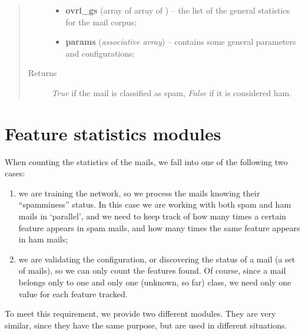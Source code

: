 \documentclass[letterpaper,10pt,english]{sphinxmanual}
\begin{document}
\begin{fulllineitems}
\begin{fulllineitems}
\begin{quote}
\begin{description}
\begin{itemize}
\item {} 
\textbf{ovrl\_gs} (array of array of {\hyperref[index:gen_stat.Stat]{}}) -- the list of the general statistics for the mail corpus;

\item {} 
\textbf{params} (\emph{associative array}) -- contains some general parameters and configurations;

\end{itemize}

\item[{Returns}] \leavevmode
\emph{True} if the mail is classified as spam, \emph{False} if it is            considered ham.

\end{description}\end{quote}

\end{fulllineitems}


\end{fulllineitems}



\chapter{Feature statistics modules}
\label{index:feature-statistics-modules}
When counting the statistics of the mails, we fall into one of the following two cases:
\begin{enumerate}
\item {} 
we are training the network, so we process the mails knowing their ``spamminess'' status. In this case we are working with both spam and ham mails in `parallel', and we need to keep track of how many times a certain feature appears in spam mails, and how many times the same feature appears in ham mails;

\item {} 
we are validating the configuration, or discovering the status of a mail (a set of mails), so we can only count the features found. Of course, since a mail belongs only to one and only one (unknown, so far) class, we need only one value for each feature tracked.

\end{enumerate}

To meet this requirement, we provide two different modules. They are very similar, since they have the same purpose, but are used in different situations.
\end{document}
